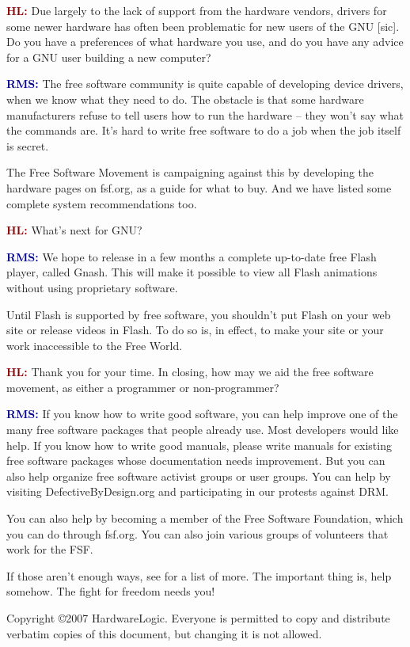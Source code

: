 \documentclass{article}
\newcommand{\hl}{\textcolor{DarkRed}{\textbf{HL: }}}
\newcommand{\rms}{\textcolor{DarkBlue}{\textbf{RMS: }}}
\begin{document}
\hl Due largely to the lack of support from the hardware vendors, drivers for some newer hardware has often been problematic for new users of the GNU [sic]. Do you have a preferences of what hardware you use, and do you have any advice for a GNU user building a new computer?

\rms The free software community is quite capable of developing device drivers, when we know what they need to do. The obstacle is that some hardware manufacturers refuse to tell users how to run the hardware -- they won't say what the commands are. It's hard to write free software to do a job when the job itself is secret.

The Free Software Movement is campaigning against this by developing the hardware pages on fsf.org, as a guide for what to buy. And we have listed some complete system recommendations too.

\hl What's next for GNU?

\rms We hope to release in a few months a complete up-to-date free Flash player, called Gnash. This will make it possible to view all Flash animations without using proprietary software.

Until Flash is supported by free software, you shouldn't put Flash on your web site or release videos in Flash. To do so is, in effect, to make your site or your work inaccessible to the Free World.

\hl Thank you for your time. In closing, how may we aid the free software movement, as either a programmer or non-programmer?

\rms If you know how to write good software, you can help improve one of the many free software packages that people already use. Most developers would like help. If you know how to write good manuals, please write manuals for existing free software packages whose documentation needs improvement. But you can also help organize free software activist groups or user groups. You can help by visiting DefectiveByDesign.org and participating in our protests against DRM.

You can also help by becoming a member of the Free Software Foundation, which you can do through fsf.org. You can also join various groups of volunteers that work for the FSF.

If those aren't enough ways, see \href{http://www.gnu.org/help}{\color{DarkRed}{www.gnu.org/help}} for a list of more. The important thing is, help somehow. The fight for freedom needs you!

\vfill
\noindent\footnotesize{Copyright \copyright 2007 HardwareLogic. Everyone is permitted to copy and distribute verbatim copies of this document, but changing it is not allowed.}
\end{document}
